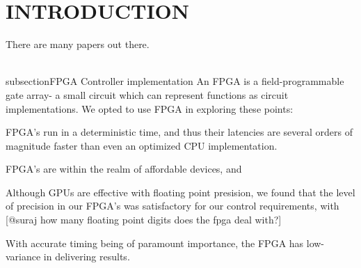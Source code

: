\section{INTRODUCTION}
There are many papers out there.


\\subsection{FPGA Controller implementation} %
\label{sub:fpga_controller_implementation}
An FPGA is a field-programmable gate array- a small circuit which can represent functions as circuit implementations.
We opted to use FPGA in exploring these points:
\item FPGA's run in a deterministic time, and thus their latencies are several orders of magnitude faster than even an optimized CPU implementation.
\item FPGA's are within the realm of affordable devices, and 
\item Although GPUs are effective with floating point presision, we found that the level of precision in our FPGA's was satisfactory for our control requirements, with [@suraj how many floating point digits does the fpga deal with?]
\item With accurate timing being of paramount importance, the FPGA has low-variance in delivering results.

